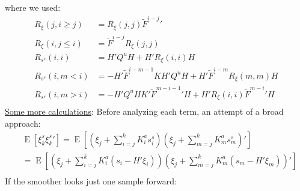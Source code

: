 \documentclass[oneside,12pt]{article}
\begin{document}
%
where we used:
%
\begin{equation}
    \begin{split}
        R_{\xi}(j,i \geq j) &= R_{\xi}(j,j) \tilde{F}^{i-j}'\\
        R_{\xi}(i,j \leq i) &= \tilde{F}^{i-j} R_{\xi}(j,j)\\
        R_{s^s}(i,i) &= H' Q^u H + H' R_{\xi}(i,i) H\\ 
        R_{s^s}(i,m < i) &=- H' \tilde{F}^{i-m-1} K H' Q^u H + H' \tilde{F}^{i-m} R_{\xi}(m,m) H\\ 
        R_{s^s}(i,m>i) &=- H' Q^u  H K' \tilde{F}^{m-i-1}'H + H' R_{\xi}(i,i) \tilde{F}^{m-i}' H\\ 
    \end{split}
\end{equation}
%
\underline{Some more calculations}:
%
Before analyzing each term, an attempt of a broad approach:
%
\begin{equation}
    \begin{split}
        &\operatorname{E}[\xi^s_{k}\xi^s_{k}'] = \operatorname{E}[(\xi_j + \sum_{i=j}^{k} K^a_{i} s^s_{i})(\xi_j + \sum_{m=j}^{k} K^a_{m} s^s_{m})']\\
        &= \operatorname{E}[(\xi_j + \sum_{i=j}^{k} K^a_{i} (s_i - H' \xi_i))(\xi_j + \sum_{m=j}^{k} K^a_{m} (s_m - H' \xi_m))']\\
    \end{split}
\end{equation}
%
If the smoother looks just one sample forward:
%
%
\end{document}
